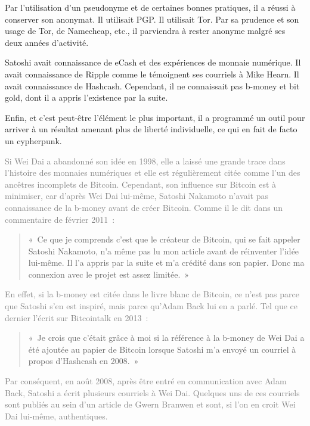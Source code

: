 Par l'utilisation d'un pseudonyme et de certaines bonnes pratiques, il a réussi à conserver son anonymat. Il utilisait PGP. Il utilisait Tor. Par sa prudence et son usage de Tor, de Namecheap, etc., il parviendra à rester anonyme malgré ses deux années d'activité.

Satoshi avait connaissance de eCash et des expériences de monnaie numérique. Il avait connaissance de Ripple comme le témoignent ses courriels à Mike Hearn. Il avait connaissance de Hashcash. Cependant, il ne connaissait pas b-money et bit gold, dont il a appris l'existence par la suite.

Enfin, et c'est peut-être l'élément le plus important, il a programmé un outil pour arriver à un résultat amenant plus de liberté individuelle, ce qui en fait de facto un cypherpunk.

\textcolor{gray}{Si Wei Dai a abandonné son idée en 1998, elle a laissé une grande trace dans l'histoire des monnaies numériques et elle est régulièrement citée comme l'un des ancêtres incomplets de Bitcoin. Cependant, son influence sur Bitcoin est à minimiser, car d'après Wei Dai lui-même, Satoshi Nakamoto n'avait pas connaissance de la b-money avant de créer Bitcoin. Comme il le dit dans un commentaire de février 2011~:}

\begin{quote}
«~Ce que je comprends c'est que le créateur de Bitcoin, qui se fait appeler Satoshi Nakamoto, n'a même pas lu mon article avant de réinventer l'idée lui-même. Il l'a appris par la suite et m'a crédité dans son papier. Donc ma connexion avec le projet est assez limitée.~»
\end{quote}

\textcolor{gray}{En effet, si la b-money est citée dans le livre blanc de Bitcoin, ce n'est pas parce que Satoshi s'en est inspiré, mais parce qu'Adam Back lui en a parlé. Tel que ce dernier l'écrit sur Bitcointalk en 2013~:}

\begin{quote}
«~Je crois que c'était grâce à moi si la référence à la b-money de Wei Dai a été ajoutée au papier de Bitcoin lorsque Satoshi m'a envoyé un courriel à propos d'Hashcash en 2008.~»
\end{quote}

\textcolor{gray}{Par conséquent, en août 2008, après être entré en communication avec Adam Back, Satoshi a écrit plusieurs courriels à Wei Dai. Quelques uns de ces courriels sont publiés au sein d'un article de Gwern Branwen et sont, si l'on en croit Wei Dai lui-même, authentiques.}

